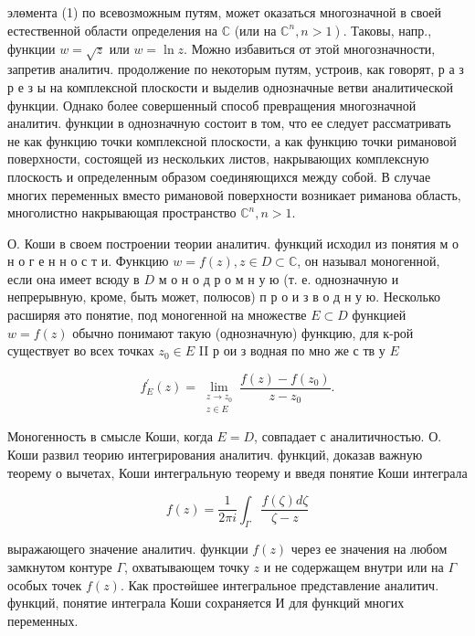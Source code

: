 \documentclass[10pt]{article}
\begin{document}
элөмента (1) по всевозможным путям, может оказаться многозначной в своей естественной области определения на $\mathbb{C}$ (или на $\left.\mathbb{C}^{n}, n>1\right)$. Таковы, напр., функции $w=\sqrt{z}$ или $w=\ln z$. Можно избавиться от этой многозначности, запретив аналитич. продолжение по некоторым путям, устроив, как говорят, р а з р е з ы на комплексной плоскости и выделив однозначные ветви аналитической функции. Однако более совершенный способ превращения многозначной аналитич. функции в однозначную состоит в том, что ее следует рассматривать не как функцию точки комплексной плоскости, а как функцию точки римановой поверхности, состоящей из нескольких листов, накрывающих комплексную плоскость и определенным образом соединяющихся между собой. В случае многих переменных вместо римановой поверхности возникает риманова область, многолистно накрывающая пространство $\mathbb{C}^{n}, n>1$.



О. Коши в своем построении теории аналитич. функций исходил из понятия м о н о г е н н о с т и. Функцию $w=f(z), z \in D \subset \mathbb{C}$, он называл моногенной, если она имеет всюду в $D$ м о н о д р о м н у ю (т. е. однозначную и непрерывную, кроме, быть может, полюсов) п р о и з в о д н у ю. Несколько расширяя әто понятие, под моногенной на множестве $E \subset D$ функцией $w=f(z)$ обычно понимают такую (однозначную) функцию, для к-рой существует во всех точках $z_{0} \in E$ II р ои з водная по мно же с тв у $E$



\[

f_{E}^{\prime}(z)=\lim _{\substack{z \rightarrow z_{0} \\ z \in E}} \frac{f(z)-f\left(z_{0}\right)}{z-z_{0}} .

\]



Моногенность в смысле Коши, когда $E=D$, совпадает с аналитичностью. О. Коши развил теорию интегрирования аналитич. функций, доказав важную теорему о вычетах, Коши интегральную теорему и введя понятие Коши интеграла



\[

f(z)=\frac{1}{2 \pi i} \int_{\Gamma} \frac{f(\zeta) d \zeta}{\zeta-z}

\]



выражающего значение аналитич. функции $f(z)$ через ее значения на любом замкнутом контуре $\Gamma$, охватывающем точку $z$ и не содержащем внутри или на $\Gamma$ особых точек $f(z)$. Как простөӥшее интегральное представление аналитич. функций, понятие интеграла Коши сохраняется И для функций многих переменных.
\end{document}
